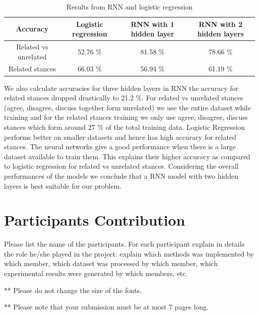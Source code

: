 \documentclass[11.5pt]{article}
\begin{document}
\begin{table}[h]
  \centering
  \begin{tabular} 
    {|c|c|c|c|}
    \hline
    
    Accuracy & Logistic regression & RNN with 1 hidden layer & RNN with 2 hidden layers \\
    \hline
    Related vs unrelated & 52.76 \% & 81.58 \% & 78.66 \% \\
    \hline
    Related stances & 66.03 \% & 56.94 \% & 61.19 \% \\
    \hline
  \end{tabular}
  \caption{Results from RNN and logistic regression}
\end{table}

We also calculate accuracies for three hidden layers in RNN the accuracy for related stances dropped drastically to 21.2 \%.
For related vs unrelated stances (agree, disagree, discuss together form unrelated) we use the entire dataset while training and for the related stances training we only use agree, disagree,
discuss stances which form around 27 \% of the total training data. Logistic Regression performs better on smaller datasets and hence has high accuracy for related stances. The neural networks give a good performance when there is a large dataset available to train them. This explains their higher accuracy as compared to logistic regression for related vs unrelated stances. Considering the overall performances of the models we conclude that a RNN model with two hidden layers is best suitable for our problem.

\newpage
\section{Participants Contribution}
Please list the name of the participants. For each participant explain in details the role he/she played in the project: explain which methods was implemented by which member, which dataset was processed by which member, which experimental results were generated by which members, etc.

\vspace{10mm}
** Please do not change the size of the fonts.

** Please note that your submission must be at most 7 pages long.



\end{document}
